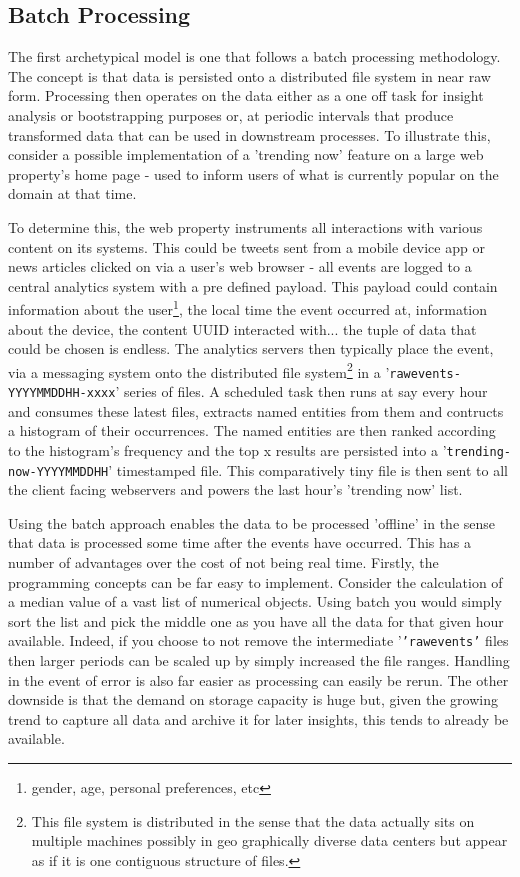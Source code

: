 \documentclass[a4paper,11pt]{scrreprt}
\begin{document}
\subsection{Batch Processing}
The first archetypical model is one that follows a batch processing methodology. The concept is that data is persisted onto a distributed file system in near raw form. Processing then operates on the data either as a one off task for insight analysis or bootstrapping purposes or, at periodic intervals that produce transformed data that can be used in downstream processes. To illustrate this, consider a possible implementation of a 'trending now' feature on a large web property's home page - used to inform users of what is currently popular on the domain at that time. 

To determine this, the web property instruments all interactions with various content on its systems. This could be tweets sent from a mobile device app or news articles clicked on via a user's web browser - all events are logged to a central analytics system with a pre defined payload. This payload could contain information about the user\footnote{gender, age, personal preferences, etc}, the local time the event occurred at, information about the device, the content UUID interacted with... the tuple of data that could be chosen is endless. The analytics servers then typically place the event, via a messaging system onto the distributed file system\footnote{This file system is distributed in the sense that the data actually sits on multiple machines possibly in geo graphically diverse data centers but appear as if it is one contiguous structure of files.} in a '\texttt{rawevents-YYYYMMDDHH-xxxx}' series of files. A scheduled task then runs at say every hour and consumes these latest files, extracts named entities from them and contructs a histogram of their occurrences. The named entities are then ranked according to the histogram's frequency and the top x results are persisted into a '\texttt{trending-now-YYYYMMDDHH}' timestamped file. This comparatively tiny file is then sent to all the client facing webservers and powers the last hour's 'trending now' list.

Using the batch approach enables the data to be processed 'offline' in the sense that data is processed some time after the events have occurred.  This has a number of advantages over the cost of not being real time. Firstly, the programming concepts can be far easy to implement. Consider the calculation of a median value of a vast list of numerical objects. Using batch you would simply sort the list and pick the middle one as you have all the data for that given hour available. Indeed, if you choose to not remove the intermediate '\texttt{'rawevents'} files then larger periods can be scaled up by simply increased the file ranges. Handling in the event of error is also far easier as processing can easily be rerun. The other downside is that the demand on storage capacity is huge but, given the growing trend to capture all data and archive it for later insights, this tends to already be available.\\
\end{document}
